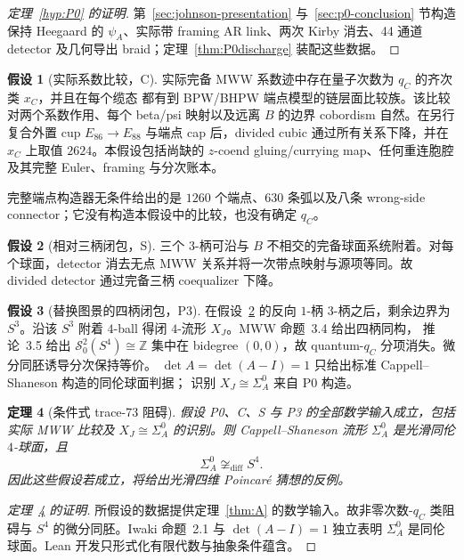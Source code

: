 \documentclass[11pt]{amsart}
\newtheorem{theorem}{定理}[section]
\theoremstyle{definition}
\newtheorem{hypothesis}[theorem]{假设}
\theoremstyle{remark}
\begin{document}
\begin{proof}[定理~\ref{hyp:P0} 的证明]
第~\ref{sec:johnson-presentation} 与~\ref{sec:p0-conclusion} 节构造保持
Heegaard 的 $\psi_A$、实际带 framing AR link、两次 Kirby 消去、44 通道
detector 及几何导出 braid；定理~\ref{thm:P0discharge} 装配这些数据。
\end{proof}

\begin{hypothesis}[实际系数比较，C]\label{hyp:P1}
实际完备 MWW 系数迹中存在量子次数为 $q_C$ 的齐次类 $x_C$，并且在每个缆态
都有到 BPW/BHPW 端点模型的链层面比较族。该比较对两个系数作用、每个 beta/psi
映射以及远离 $B$ 的边界 cobordism 自然。在另行复合外置 cup
$E_{86}\to E_{88}$ 与端点 cap 后，divided cubic 通过所有关系下降，并在 $x_C$
上取值 $2624$。本假设包括尚缺的 $z$-coend gluing/currying map、任何重连胞腔
及其完整 Euler、framing 与分次账本。
\end{hypothesis}

完整端点构造器无条件给出的是 $1260$ 个端点、$630$ 条弧以及八条
wrong-side connector；它没有构造本假设中的比较，也没有确定 $q_C$。

\begin{hypothesis}[相对三柄闭包，S]\label{hyp:P2}
三个 $3$-柄可沿与 $B$ 不相交的完备球面系统附着。对每个球面，detector 消去无点 MWW 关系并将一次带点映射与源项等同。故 divided detector 通过完备三柄 coequalizer 下降。
\end{hypothesis}

\begin{hypothesis}[替换图景的四柄闭包，P3]\label{hyp:P3}
在假设~\ref{hyp:P2} 的反向 $1$-柄 $3$-柄之后，剩余边界为 $S^3$。沿该
$S^3$ 附着 $4$-ball 得闭 $4$-流形 $X_J$。MWW 命题~3.4 给出四柄同构，
推论~3.5 给出 $\mathcal S^2_0(S^4)\cong\mathbb Z$ 集中在 bidegree
$(0,0)$，故 quantum-$q_C$ 分项消失。微分同胚诱导分次保持等价。
$\det A=\det(A-I)=1$ 只给出标准 Cappell--Shaneson 构造的同伦球面判据；
识别 $X_J\cong\Sigma_A^0$ 来自 P0 构造。
\end{hypothesis}

\begin{theorem}[条件式 trace-73 阻碍]\label{thm:joined}
假设 P0、C、S 与 P3 的全部数学输入成立，包括实际 MWW 比较及
$X_J\cong\Sigma_A^0$ 的识别。则
Cappell--Shaneson 流形 $\Sigma_A^0$ 是光滑同伦 $4$-球面，且
\[
\Sigma_A^0\not\cong_{\mathrm{diff}}S^4.
\]
因此这些假设若成立，将给出光滑四维 Poincaré 猜想的反例。
\end{theorem}

\begin{proof}[定理~\ref{thm:joined} 的证明]
所假设的数据提供定理~\ref{thm:A} 的数学输入。故非零次数-$q_C$ 类阻碍与
$S^4$ 的微分同胚。Iwaki 命题~2.1 与 $\det(A-I)=1$ 独立表明
$\Sigma_A^0$ 是同伦球面。Lean 开发只形式化有限代数与抽象条件蕴含。
\end{proof}
\end{document}
